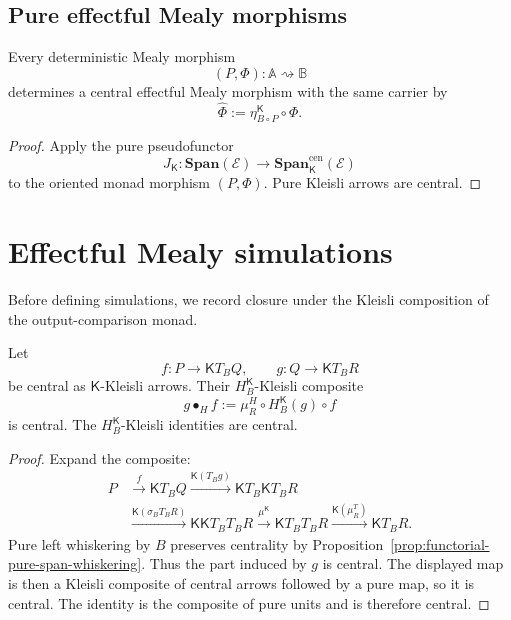 \subsection{Pure effectful Mealy morphisms}
\label{subsec:pure-effectful-mealy-morphisms}

\begin{proposition}
\label{prop:pure-effectful-image}
Every deterministic Mealy morphism
\[
    (P,\Phi):
    \mathbb A\rightsquigarrow\mathbb B
\]
determines a central effectful Mealy morphism with the same carrier by
\[
    \widehat\Phi
    :=
    \eta^{\mathsf K}_{B\circ P}\circ\Phi.
\]
\end{proposition}

\begin{proof}
Apply the pure pseudofunctor
\[
    J_{\mathsf K}:
    \mathbf{Span}(\mathcal E)
    \to
    \mathbf{Span}^{\mathrm{cen}}_{\mathsf K}(\mathcal E)
\]
to the oriented monad morphism \((P,\Phi)\).  Pure Kleisli arrows are
central.
\end{proof}

\section{Effectful Mealy simulations}
\label{sec:effectful-mealy-simulations}

Before defining simulations, we record closure under the Kleisli composition
of the output-comparison monad.

\begin{proposition}
\label{prop:central-output-comparison-composition}
Let
\[
    f:P\to\mathsf KT_BQ,
    \qquad
    g:Q\to\mathsf KT_BR
\]
be central as \(\mathsf K\)-Kleisli arrows.  Their
\(H_B^{\mathsf K}\)-Kleisli composite
\[
    g\mathbin{\bullet_H}f
    :=
    \mu^H_R
    \circ
    H_B^{\mathsf K}(g)
    \circ
    f
\]
is central.  The \(H_B^{\mathsf K}\)-Kleisli identities are central.
\end{proposition}

\begin{proof}
Expand the composite:
\[
\begin{aligned}
P
&\xrightarrow{f}
\mathsf KT_BQ
\xrightarrow{\mathsf K(T_Bg)}
\mathsf KT_B\mathsf KT_BR
\\
&\xrightarrow{\mathsf K(\sigma_BT_BR)}
\mathsf K\mathsf KT_BT_BR
\xrightarrow{\mu^{\mathsf K}}
\mathsf KT_BT_BR
\xrightarrow{\mathsf K(\mu^T_R)}
\mathsf KT_BR.
\end{aligned}
\]
Pure left whiskering by \(B\) preserves centrality by
Proposition~\ref{prop:functorial-pure-span-whiskering}.  Thus the part
induced by \(g\) is central.  The displayed map is then a Kleisli composite
of central arrows followed by a pure map, so it is central.  The identity is
the composite of pure units and is therefore central.
\end{proof}

